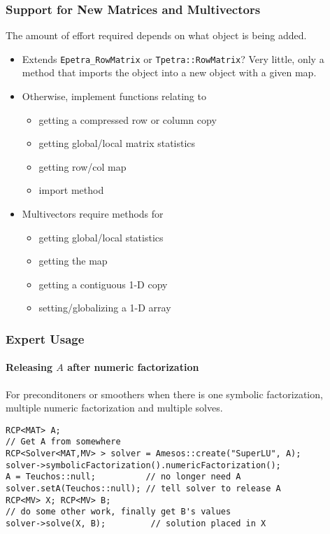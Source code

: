 \documentclass[xcolor=dvipsnames]{beamer}
\begin{document}
\begin{frame}
  \frametitle{Support for New Matrices and Multivectors}

  The amount of effort required depends on what object is being added.

  \begin{itemize}
    \item Extends \texttt{Epetra\_RowMatrix} or
      \texttt{Tpetra::RowMatrix}?  Very little, only a method that
      imports the object into a new object with a given map.
    \item Otherwise, implement functions relating to
      \begin{itemize}
        \item getting a compressed row or column copy
        \item getting global/local matrix statistics
        \item getting row/col map
        \item import method
      \end{itemize}
    \item Multivectors require methods for
      \begin{itemize}
        \item getting global/local statistics
        \item getting the map
        \item getting a contiguous 1-D copy
        \item setting/globalizing a 1-D array
      \end{itemize}
  \end{itemize}
\end{frame}

\begin{frame}[fragile]
  \frametitle{Expert Usage}
  \framesubtitle{Releasing $A$ after numeric factorization}
  For preconditoners or smoothers when there is one symbolic factorization,
  multiple numeric factorization and multiple solves.
  \begin{lstlisting}
RCP<MAT> A;
// Get A from somewhere
RCP<Solver<MAT,MV> > solver = Amesos::create("SuperLU", A);
solver->symbolicFactorization().numericFactorization();
A = Teuchos::null;          // no longer need A
solver.setA(Teuchos::null); // tell solver to release A
RCP<MV> X; RCP<MV> B;
// do some other work, finally get B's values
solver->solve(X, B);         // solution placed in X
  \end{lstlisting}
\end{frame}
\end{document}
